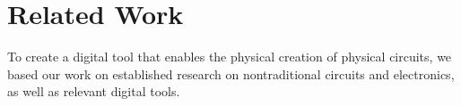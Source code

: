 \documentclass{sigchi}
\begin{document}




\section{Related Work}
To create a digital tool that enables the physical creation of physical circuits, we based our work on established research on nontraditional circuits and electronics, as well as relevant digital tools. 

\end{document}
